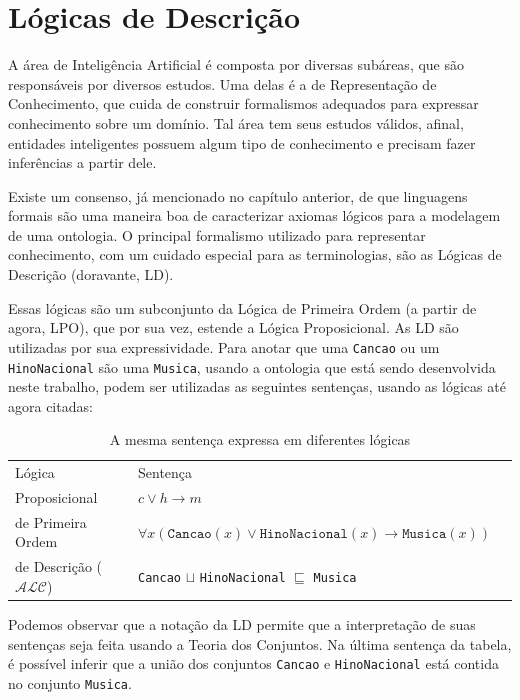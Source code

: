 \chapter{Lógicas de Descrição}

\lettrine{A}{} área de Inteligência Artificial é composta por diversas subáreas, que são responsáveis por diversos estudos. Uma delas é a de Representação de Conhecimento, que cuida de construir formalismos adequados para expressar conhecimento sobre um domínio. Tal área tem seus estudos válidos, afinal, entidades inteligentes possuem algum tipo de conhecimento e precisam fazer inferências a partir dele.

Existe um consenso, já mencionado no capítulo anterior, de que linguagens formais são uma maneira boa de caracterizar axiomas lógicos para a modelagem de uma ontologia. O principal formalismo utilizado para representar conhecimento, com um cuidado especial para as terminologias, são as Lógicas de Descrição (doravante, LD).

Essas lógicas são um subconjunto da Lógica de Primeira Ordem (a partir de agora, LPO), que por sua vez, estende a Lógica Proposicional. As LD são utilizadas por sua expressividade. Para anotar que uma \texttt{Cancao} ou um \texttt{HinoNacional} são uma \texttt{Musica}, usando a ontologia que está sendo desenvolvida neste trabalho, podem ser utilizadas as seguintes sentenças, usando as lógicas até agora citadas:

\begin{table}[H]
	\centering
	\begin{tabular}{|l|l|l}
		\cline{1-2}
		Lógica                           & Sentença                                                                             & \\ \cline{1-2}
		Proposicional                    & $c \lor h \to m$                   & \\ \cline{1-2}
		de Primeira Ordem                & $\forall x(\texttt{Cancao}(x) \lor \texttt{HinoNacional}(x) \to \texttt{Musica}(x))$ & \\ \cline{1-2}
		de Descrição ($ \mathcal{ALC} $) & \texttt{Cancao} $\sqcup$ \texttt{HinoNacional} $\sqsubseteq$ \texttt{Musica}         & \\ \cline{1-2}
	\end{tabular}
\caption{A mesma sentença expressa em diferentes lógicas}
\end{table}

Podemos observar que a notação da LD permite que a interpretação de suas sentenças seja feita usando a Teoria dos Conjuntos. Na última sentença da tabela, é possível inferir que a união dos conjuntos \texttt{Cancao} e \texttt{HinoNacional} está contida no conjunto \texttt{Musica}.

